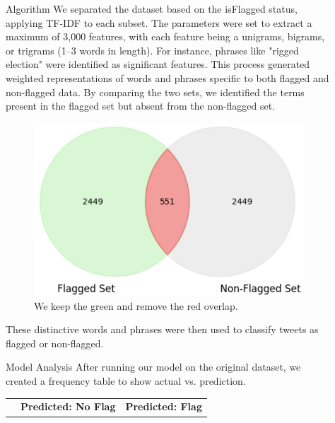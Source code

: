 \documentclass[final]{beamer}
\newlength{\sepwidth}
\newlength{\colwidth}
\newcommand{\separatorcolumn}{\begin{column}{\sepwidth}\end{column}}
\begin{document}
\begin{frame}[t]
\begin{columns}[t]
\begin{column}{\colwidth}
\end{column}

\separatorcolumn

\begin{column}{\colwidth}

    \begin{block}{Algorithm}
        We separated the dataset based on the isFlagged status, applying TF-IDF to each subset. The parameters were set to extract a maximum of 3,000 features, with each feature being a unigrams, bigrams, or trigrams (1–3 words in length). For instance, phrases like "rigged election" were identified as significant features. This process generated weighted representations of words and phrases specific to both flagged and non-flagged data. By comparing the two sets, we identified the terms present in the flagged set but absent from the non-flagged set. 
        \begin{figure}
            \centering
            \includegraphics[scale=0.9]{figures/venndiagram.png}
            \caption{We keep the green and remove the red overlap.}
        \end{figure}
        These distinctive words and phrases were then used to classify tweets as flagged or non-flagged.
    \end{block}
    \vspace*{-5mm}
    \begin{block}{Model Analysis}
        After running our model on the original dataset, we created a frequency table to show actual vs. prediction.
        \begin{table}[h!]
            \centering
            \begin{tabular}{|c|c|c|}
                \hline
                \textbf{} & \textbf{Predicted: No Flag} & \textbf{Predicted: Flag} \\

\end{tabular}
\end{table}
\end{block}
\end{column}
\end{columns}
\end{frame}
\end{document}
